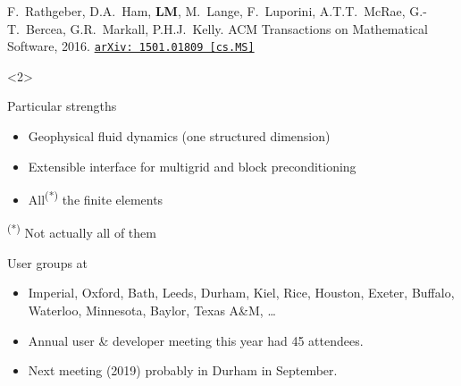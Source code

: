 \documentclass[presentation, 10pt]{beamer}
\newcommand{\arxivlink}[2]{%
  \href{https://www.arxiv.org/abs/#1}%
  {\texttt{arXiv:\,#1\,[#2]}}%
}
\begin{document}
\begin{frame}[t]
\begin{overlayarea}{\textwidth}{\textheight}
\begin{onlyenv}
    \begin{flushright}
      {\scriptsize F.~Rathgeber, D.A.~Ham, \textbf{LM}, M.~Lange,
        F.~Luporini, A.T.T.~McRae, G.-T.~Bercea, G.R.~Markall,
        P.H.J.~Kelly. ACM Transactions on Mathematical Software,
        2016. \arxivlink{1501.01809}{cs.MS}\nocite{Rathgeber:2016}}
    \end{flushright}
  \end{onlyenv}
  \begin{onlyenv}<2>
    \begin{block}{Particular strengths}
      \begin{itemize}
      \item Geophysical fluid dynamics (one structured dimension)
        
      \item Extensible interface for multigrid and block
        preconditioning
      \item All\textsuperscript{(*)} the finite elements
      \end{itemize}

      \textsuperscript{(*)} Not actually all of them
    \end{block}
    \begin{block}{User groups at}
      \begin{itemize}
      \item Imperial, Oxford, Bath, Leeds, Durham, Kiel, Rice,
        Houston, Exeter, Buffalo, Waterloo, Minnesota, Baylor, Texas
        A\&M, \dots
      \item Annual user \& developer meeting this year had 45
        attendees.
      \item Next meeting (2019) probably in Durham in September.
      \end{itemize}
    \end{block}
  \end{onlyenv}
\end{overlayarea}
\end{frame}
\end{document}
